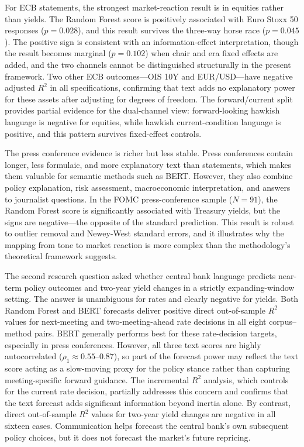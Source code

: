 For ECB statements, the strongest market-reaction result is in equities rather
than yields. The Random Forest score is positively associated with Euro Stoxx 50
responses ($p=0.028$), and this result survives the three-way horse race
($p=0.045$). The positive sign is consistent with an information-effect
interpretation, though the result becomes marginal ($p=0.102$) when chair and
era fixed effects are added, and the two channels cannot be distinguished
structurally in the present framework. Two other ECB outcomes---OIS 10Y and
EUR/USD---have negative adjusted $R^2$ in all specifications, confirming that
text adds no explanatory power for these assets after adjusting for degrees of
freedom. The forward/current split provides partial evidence for the
dual-channel view: forward-looking hawkish language is negative for equities,
while hawkish current-condition language is positive, and this pattern survives
fixed-effect controls.

The press conference evidence is richer but less stable. Press conferences
contain longer, less formulaic, and more explanatory text than statements, which
makes them valuable for semantic methods such as BERT. However, they
also combine policy explanation, risk assessment, macroeconomic interpretation,
and answers to journalist questions. In the FOMC press-conference sample
($N=91$), the Random Forest score is significantly associated with Treasury
yields, but the signs are negative---the opposite of the standard prediction.
This result is robust to outlier removal and Newey-West standard errors, and
it illustrates why the mapping from tone to market reaction is more complex
than the methodology's theoretical framework suggests.

The second research question asked whether central bank language predicts
near-term policy outcomes and two-year yield changes in a strictly
expanding-window setting. The answer is unambiguous for rates and clearly
negative for yields. Both Random Forest and BERT forecasts deliver
positive direct out-of-sample $R^2$ values for next-meeting and two-meeting-ahead
rate decisions in all eight corpus--method pairs. BERT generally performs
best for these rate-decision targets, especially in press conferences. However,
all three text scores are highly autocorrelated ($\rho_1 \approx 0.55$--$0.87$),
so part of the forecast power may reflect the text score acting as a slow-moving
proxy for the policy stance rather than capturing meeting-specific forward
guidance. The incremental $R^2$ analysis, which controls for the current rate
decision, partially addresses this concern and confirms that the text forecast
adds significant information beyond inertia alone. By contrast, direct
out-of-sample $R^2$ values for two-year yield changes are negative in all
sixteen cases. Communication helps forecast the central bank's own subsequent
policy choices, but it does not forecast the market's future repricing.

